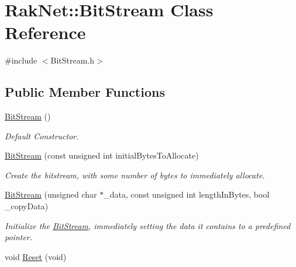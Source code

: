 \hypertarget{class_rak_net_1_1_bit_stream}{\section{Rak\-Net\-:\-:Bit\-Stream Class Reference}
\label{class_rak_net_1_1_bit_stream}
}


{\ttfamily \#include $<$Bit\-Stream.\-h$>$}

\subsection*{Public Member Functions}
\begin{DoxyCompactItemize}
\item 
\hypertarget{class_rak_net_1_1_bit_stream_a1aeb4088ac7a611c9eebc629df86890c}{\hyperlink{class_rak_net_1_1_bit_stream_a1aeb4088ac7a611c9eebc629df86890c}{Bit\-Stream} ()}\label{class_rak_net_1_1_bit_stream_a1aeb4088ac7a611c9eebc629df86890c}

\begin{DoxyCompactList}\small\item\em Default Constructor. \end{DoxyCompactList}\item 
\hyperlink{class_rak_net_1_1_bit_stream_a47b1c7ce200c4815bd2a42d454244bb4}{Bit\-Stream} (const unsigned int initial\-Bytes\-To\-Allocate)
\begin{DoxyCompactList}\small\item\em Create the bitstream, with some number of bytes to immediately allocate. \end{DoxyCompactList}\item 
\hyperlink{class_rak_net_1_1_bit_stream_a04a200eaf5b379cad2e30d5de15a2c9a}{Bit\-Stream} (unsigned char $\ast$\-\_\-data, const unsigned int length\-In\-Bytes, bool \-\_\-copy\-Data)
\begin{DoxyCompactList}\small\item\em Initialize the \hyperlink{class_rak_net_1_1_bit_stream}{Bit\-Stream}, immediately setting the data it contains to a predefined pointer. \end{DoxyCompactList}\item 
\hypertarget{class_rak_net_1_1_bit_stream_a60690472e9540e6c3f4b69961e19440f}{void \hyperlink{class_rak_net_1_1_bit_stream_a60690472e9540e6c3f4b69961e19440f}{Reset} (void)}\label{class_rak_net_1_1_bit_stream_a60690472e9540e6c3f4b69961e19440f}


\end{DoxyCompactItemize}
